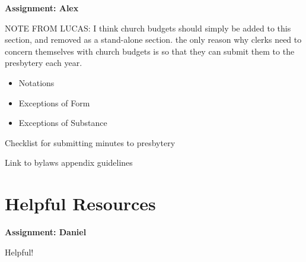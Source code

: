 \documentclass[
]{book}
\providecommand{\tightlist}{%
  \setlength{\itemsep}{0pt}\setlength{\parskip}{0pt}}
\begin{document}
\textbf{Assignment: Alex}

NOTE FROM LUCAS: I think church budgets should simply be added to this section, and removed as a stand-alone section. the only reason why clerks need to concern themselves with church budgets is so that they can submit them to the presbytery each year.

\begin{itemize}
\tightlist
\item
  Notations
\item
  Exceptions of Form
\item
  Exceptions of Substance
\end{itemize}

Checklist for submitting minutes to presbytery

Link to bylaws appendix guidelines

\hypertarget{helpful-resources}{%
\chapter{Helpful Resources}\label{helpful-resources}}

\textbf{Assignment: Daniel}

Helpful!
\end{document}
